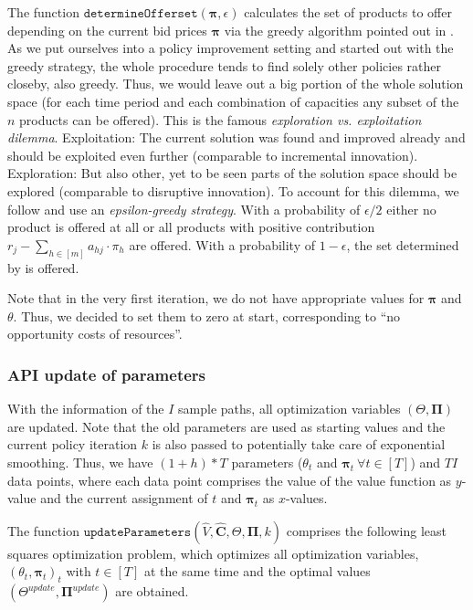 The function $\texttt{determineOfferset}(\boldsymbol{\pi}, \epsilon)$ calculates the set of products to offer depending on the current bid prices $\boldsymbol{\pi}$ via the greedy algorithm pointed out in \cite{Bront.2009}. As we put ourselves into a policy improvement setting and started out with the greedy strategy, the whole procedure tends to find solely other policies rather closeby, \ie also greedy. Thus, we would leave out a big portion of the whole solution space (for each time period and each combination of capacities any subset of the $n$ products can be offered). This is the famous \emph{exploration vs. exploitation dilemma}. Exploitation: The current solution was found and improved already and should be exploited even further (comparable to incremental innovation). Exploration: But also other, yet to be seen parts of the solution space should be explored (comparable to disruptive innovation). To account for this dilemma, we follow \cite{Koch.2017} and use an \emph{epsilon-greedy strategy}. With a probability of $\epsilon/2$ either no product is offered at all or all products with positive contribution $r_j - \sum_{h \in [m]} a_{hj} \cdot \pi_h$ are offered. With a probability of $1-\epsilon$, the set determined by  is offered.

Note that in the very first iteration, we do not have appropriate values for $\boldsymbol{\pi}$ and $\theta$. Thus, we decided to set them to zero at start, corresponding to \enquote{no opportunity costs of resources}.


\subsubsection{API update of parameters}\label{sec-updateParameter}

With the information of the $I$ sample paths, all optimization variables $\left(\Theta, \boldsymbol{\Pi} \right)$ are updated. Note that the old parameters are used as starting values and the current policy iteration $k$ is also passed to potentially take care of exponential smoothing. Thus, we have $(1+h)*T$ parameters ($\theta_t$ and $\boldsymbol{\pi}_t ~\forall t \in [T]$) and $TI$ data points, where each data point comprises the value of the value function as $y$-value and the current assignment of $t$ and $\boldsymbol{\pi}_t$ as $x$-values. 

The function $\texttt{updateParameters}(\hat{V}, \boldsymbol{\hat{C}}, \Theta, \boldsymbol{\Pi}, k)$ comprises the following least squares optimization problem, which optimizes all optimization variables, $(\theta_t, \boldsymbol{\pi}_t)_t$ with $t \in [T]$ at the same time and the optimal values $(\Theta^{update}, \boldsymbol{\Pi}^{update})$ are obtained.

